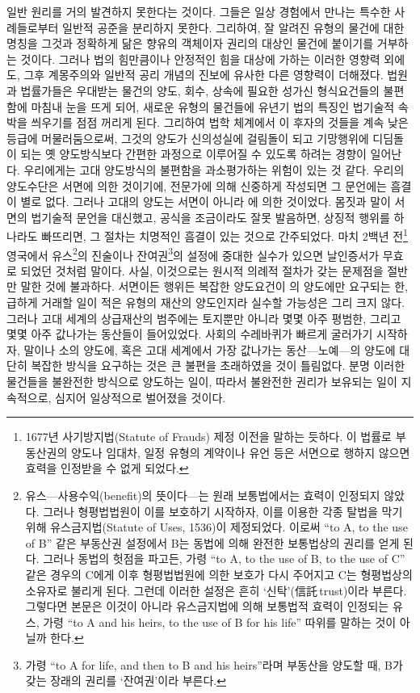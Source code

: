 일반 원리를 거의 발견하지 못한다는 것이다.
그들은 일상 경험에서 만나는 특수한 사례들로부터
일반적 공준을 분리하지 못한다.
그리하여,
잘 알려진 유형의 물건에 대한 명칭을
그것과 정확하게 닮은 향유의 객체이자 권리의 대상인 물건에
붙이기를 거부하는 것이다.
그러나
법의 힘만큼이나 안정적인 힘을 대상에 가하는
이러한 영향력 외에도,
그후
계몽주의와 일반적 공리 개념의 진보에 유사한
다른 영향력이 더해졌다.
법원과 법률가들은
우대받는 물건의 양도, 회수, 상속에 필요한 성가신 형식요건들의
불편함에 마침내 눈을 뜨게 되어,
새로운 유형의 물건들에
유년기 법의 특징인 법기술적 속박을 씌우기를 점점 꺼리게 된다.
그리하여
법학 체계에서
이 후자의 것들을 계속 낮은 등급에 머물러둠으로써,
그것의 양도가
신의성실에 걸림돌이 되고 기망행위에 디딤돌이 되는
옛 양도방식보다 간편한 과정으로 이루어질 수 있도록
하려는 경향이 일어난다.
우리에게는 고대 양도방식의 불편함을 과소평가하는 위험이 있는 것 같다.
우리의 양도수단은 서면에 의한 것이기에,
전문가에 의해 신중하게 작성되면 그 문언에는 흠결이 별로 없다.
그러나 고대의 양도는 서면이 아니라 에 의한 것이었다.
몸짓과 말이 서면의 법기술적 문언을 대신했고,
공식을 조금이라도 잘못 발음하면,
상징적 행위를 하나라도 빠뜨리면,
그 절차는 치명적인 흠결이 있는 것으로 간주되었다.
마치 2백년 전\footnote{%
  1677년 사기방지법(Statute of Frauds) 제정 이전을 말하는 듯하다.
  이 법률로 부동산권의 양도나 임대차, 일정 유형의 계약이나 유언 등은
  서면으로 행하지 않으면 효력을 인정받을 수 없게 되었다.
  }
영국에서 유스\footnote{%
  유스---사용수익(benefit)의 뜻이다---는 원래 보통법에서는
  효력이 인정되지 않았다. 그러나 형평법법원이 이를 보호하기 시작하자,
  이를 이용한 각종 탈법을 막기 위해
  유스금지법(Statute of Uses, 1536)이 제정되었다. 이로써
  ``to A, to the use of B'' 같은 부동산권 설정에서 B는 동법에 의해
  완전한 보통법상의 권리를 얻게 된다.
  그러나 동법의 헛점을 파고든, 가령
  ``to A, to the use of B, to the use of C'' 같은 경우의 C에게
  이후 형평법법원에 의한 보호가 다시 주어지고
  C는 형평법상의 소유자로 불리게 된다.
  그런데 이러한 설정은 흔히 `신탁'(信託\,trust)이라 부른다.
  그렇다면 본문은 이것이 아니라 유스금지법에 의해 보통법적 효력이
  인정되는 유스, 가령
  ``to A and his heirs, to the use of B for his life'' 따위를
  말하는 것이 아닐까 한다.
}의 진술이나
잔여권\footnote{%
  가령 ``to A for life, and then to B and his heirs''라며
  부동산을 양도할 때,
  B가 갖는 장래의 권리를 `잔여권'이라 부른다.
}의 설정에
중대한 실수가 있으면 날인증서가 무효로 되었던 것처럼 말이다.
사실, 이것으로는 원시적 의례적 절차가 갖는 문제점을 절반만 말한 것에 불과하다.
서면이든 행위든 복잡한 양도요건이 의 양도에만 요구되는 한,
급하게 거래할 일이 적은 유형의 재산의 양도인지라
실수할 가능성은 그리 크지 않다.
그러나 고대 세계의 상급재산의 범주에는
토지뿐만 아니라 몇몇 아주 평범한, 그리고 몇몇 아주 값나가는 동산들이
들어있었다.
사회의 수레바퀴가 빠르게 굴러가기 시작하자,
말이나 소의 양도에, 혹은
고대 세계에서 가장 값나가는 동산---노예---의
양도에 대단히 복잡한 방식을 요구하는 것은
큰 불편을 초래하였을 것이 틀림없다.
분명
이러한 물건들을 불완전한 방식으로 양도하는 일이,
따라서 불완전한 권리가 보유되는 일이
지속적으로, 심지어 일상적으로 벌어졌을 것이다.

